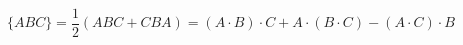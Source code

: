 \begin{equation}        
         \{ABC\}=\frac{1}{2}(ABC+CBA)=(A\cdot B)\cdot C+A\cdot (B\cdot C)-(A\cdot C)\cdot B
\end{equation}

